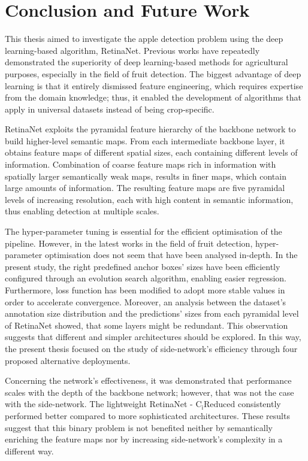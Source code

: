 \chapter{Conclusion and Future Work} \label{Chapter: Conclusion}
This thesis aimed to investigate the apple detection problem using the deep learning-based algorithm, RetinaNet. Previous works have repeatedly demonstrated the superiority of deep learning-based methods for agricultural purposes, especially in the field of fruit detection. The biggest advantage of deep learning is that it entirely dismissed feature engineering, which requires expertise from the domain knowledge; thus, it enabled the development of algorithms that apply in universal datasets instead of being crop-specific.

RetinaNet exploits the pyramidal feature hierarchy of the backbone network to build higher-level semantic maps. From each intermediate backbone layer, it obtains feature maps of different spatial sizes, each containing different levels of information. Combination of coarse feature maps rich in information with spatially larger semantically weak maps, results in finer maps, which contain large amounts of information. The resulting feature maps are five pyramidal levels of increasing resolution, each with high content in semantic information, thus enabling detection at multiple scales.

The hyper-parameter tuning is essential for the efficient optimisation of the pipeline. However, in the latest works in the field of fruit detection, hyper-parameter optimisation does not seem that have been analysed in-depth. In the present study, the right predefined anchor boxes' sizes have been efficiently configured through an evolution search algorithm, enabling easier regression. Furthermore, loss function has been modified to adopt more stable values in order to accelerate convergence. Moreover, an analysis between the dataset's annotation size distribution and the predictions' sizes from each pyramidal level of RetinaNet showed, that some layers might be redundant. This observation suggests that different and simpler architectures should be explored. In this way, the present thesis focused on the study of side-network's efficiency through four proposed alternative deployments.

Concerning the network's effectiveness, it was demonstrated that performance scales with the depth of the backbone network; however, that was not the case with the side-network. The lightweight RetinaNet - $\text{C}_\text{i}\text{Reduced}$ consistently performed better compared to more sophisticated architectures. These results suggest that this binary problem is not benefited neither by semantically enriching the feature maps nor by increasing side-network's complexity in a different way.

